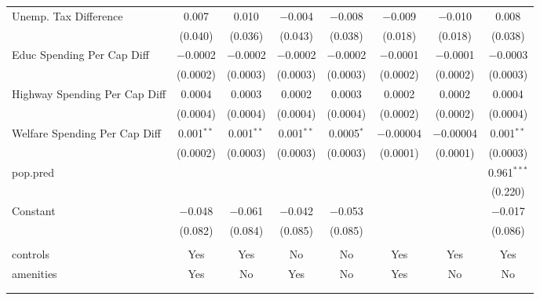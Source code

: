 \begin{table}[!htbp]
\begin{tabular}{@{\extracolsep{5pt}}lccccccc}
  Unemp. Tax Difference & 0.007 & 0.010 & $-$0.004 & $-$0.008 & $-$0.009 & $-$0.010 & 0.008 \\ 
  & (0.040) & (0.036) & (0.043) & (0.038) & (0.018) & (0.018) & (0.038) \\ 
  Educ Spending Per Cap Diff & $-$0.0002 & $-$0.0002 & $-$0.0002 & $-$0.0002 & $-$0.0001 & $-$0.0001 & $-$0.0003 \\ 
  & (0.0002) & (0.0003) & (0.0003) & (0.0003) & (0.0002) & (0.0002) & (0.0003) \\ 
  Highway Spending Per Cap Diff & 0.0004 & 0.0003 & 0.0002 & 0.0003 & 0.0002 & 0.0002 & 0.0004 \\ 
  & (0.0004) & (0.0004) & (0.0004) & (0.0004) & (0.0002) & (0.0002) & (0.0004) \\ 
  Welfare Spending Per Cap Diff & 0.001$^{**}$ & 0.001$^{**}$ & 0.001$^{**}$ & 0.0005$^{*}$ & $-$0.00004 & $-$0.00004 & 0.001$^{**}$ \\ 
  & (0.0002) & (0.0003) & (0.0003) & (0.0003) & (0.0001) & (0.0001) & (0.0003) \\ 
  pop.pred &  &  &  &  &  &  & 0.961$^{***}$ \\ 
  &  &  &  &  &  &  & (0.220) \\ 
  Constant & $-$0.048 & $-$0.061 & $-$0.042 & $-$0.053 &  &  & $-$0.017 \\ 
  & (0.082) & (0.084) & (0.085) & (0.085) &  &  & (0.086) \\ 
 \hline \\[-1.8ex] 
controls & Yes & Yes & No & No & Yes & Yes & Yes \\ 
amenities & Yes & No & Yes & No & Yes & No & No \\ 
\hline \\[-1.8ex] 
\hline 
\hline \\[-1.8ex] 
\end{tabular} 
\end{table} 
